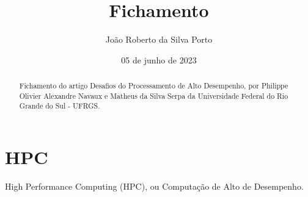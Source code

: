 \documentclass{article}
\begin{document}
       
\title{Fichamento}
\date{05 de junho de 2023}
\author{João Roberto da Silva Porto}
\begin{abstract}
Fichamento do artigo Desafios do Processamento de Alto Desempenho, 
por Philippe Olivier Alexandre Navaux e Matheus da Silva Serpa da Universidade Federal do Rio Grande
do Sul - UFRGS.
\end{abstract}
\section*{HPC}
High Performance Computing (HPC), ou Computação de Alto de Desempenho.
\end{document}
